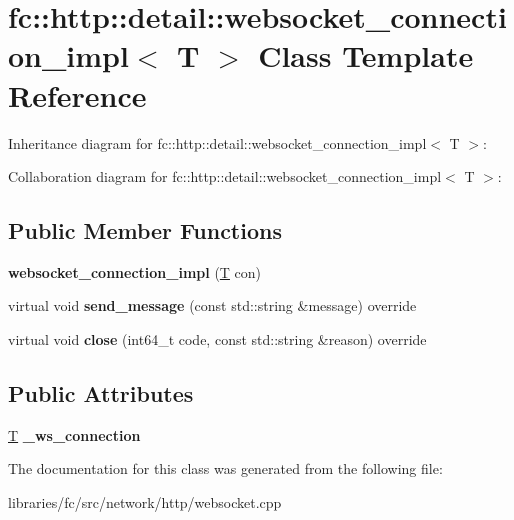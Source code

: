 \hypertarget{classfc_1_1http_1_1detail_1_1websocket__connection__impl}{}\section{fc\+:\+:http\+:\+:detail\+:\+:websocket\+\_\+connection\+\_\+impl$<$ T $>$ Class Template Reference}
\label{classfc_1_1http_1_1detail_1_1websocket__connection__impl}


Inheritance diagram for fc\+:\+:http\+:\+:detail\+:\+:websocket\+\_\+connection\+\_\+impl$<$ T $>$\+:


Collaboration diagram for fc\+:\+:http\+:\+:detail\+:\+:websocket\+\_\+connection\+\_\+impl$<$ T $>$\+:
\subsection*{Public Member Functions}
\begin{DoxyCompactItemize}
\item 
\mbox{\label{classfc_1_1http_1_1detail_1_1websocket__connection__impl_a3739b67ae9b67d3e1acf400f90dc6dd6}} 
{\bfseries websocket\+\_\+connection\+\_\+impl} (\mbox{\hyperlink{struct_t}{T}} con)
\item 
\mbox{\label{classfc_1_1http_1_1detail_1_1websocket__connection__impl_a0a7bde6d2a19c325d5ff022339e3822a}} 
virtual void {\bfseries send\+\_\+message} (const std\+::string \&message) override
\item 
\mbox{\label{classfc_1_1http_1_1detail_1_1websocket__connection__impl_a4acaa8c78b8ad95b014620a62bf51227}} 
virtual void {\bfseries close} (int64\+\_\+t code, const std\+::string \&reason) override
\end{DoxyCompactItemize}
\subsection*{Public Attributes}
\begin{DoxyCompactItemize}
\item 
\mbox{\label{classfc_1_1http_1_1detail_1_1websocket__connection__impl_a64b994b0ff5ae1c04f99bd2a20a4a2c7}} 
\mbox{\hyperlink{struct_t}{T}} {\bfseries \+\_\+ws\+\_\+connection}
\end{DoxyCompactItemize}


The documentation for this class was generated from the following file\+:\begin{DoxyCompactItemize}
\item 
libraries/fc/src/network/http/websocket.\+cpp\end{DoxyCompactItemize}
